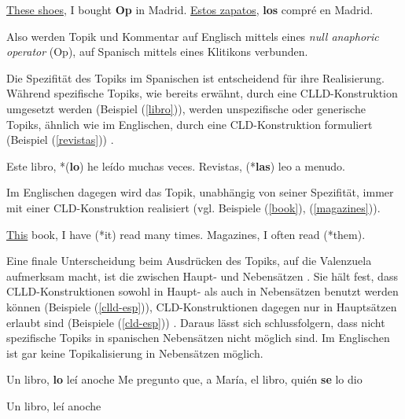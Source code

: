 \begin{exe}
    \ex \label{shoes} \uline{These shoes}, I bought \textbf{Op} in Madrid.
    \ex \label{zapatos} \uline{Estos zapatos}, \textbf{los} compré en Madrid.
\end{exe}

Also werden Topik und Kommentar auf Englisch mittels eines \textit{null anaphoric operator} (Op),
auf Spanisch mittels eines Klitikons verbunden.

Die Spezifität des Topiks im Spanischen ist entscheidend für ihre Realisierung.
Während spezifische Topiks, wie bereits erwähnt, durch eine CLLD-Konstruktion umgesetzt werden (Beispiel (\ref{libro})),
werden unspezifische oder generische Topiks, ähnlich wie im Englischen, durch eine CLD-Konstruktion formuliert (Beispiel (\ref{revistas})) \cite[vgl.][S.2]{Valenzuela05}.

\begin{exe}
    \ex \label{libro} Este libro, *(\textbf{lo}) he leído muchas veces.
    \ex \label{revistas} Revistas, (*\textbf{las}) leo a menudo.
\end{exe}

Im Englischen dagegen wird das Topik, unabhängig von seiner Spezifität, immer mit einer CLD-Konstruktion realisiert (vgl. Beispiele (\ref{book}), (\ref{magazines})).

\begin{exe}
    \ex \label{book} \uline{This} book, I have (*it) read many times.
    \ex \label{magazines} Magazines, I often read (*them).
\end{exe}

Eine finale Unterscheidung beim Ausdrücken des Topiks, auf die Valenzuela aufmerksam macht, ist die zwischen Haupt- und Nebensätzen \cite[S.2-3]{Valenzuela05}.
Sie hält fest, dass CLLD-Konstruktionen sowohl in Haupt- als auch in Nebensätzen benutzt werden können (Beispiele (\ref{clld-esp})),
CLD-Konstruktionen dagegen nur in Hauptsätzen erlaubt sind (Beispiele (\ref{cld-esp})) \cite[S.3]{Valenzuela05}.
Daraus lässt sich schlussfolgern, dass nicht spezifische Topiks in spanischen Nebensätzen nicht möglich sind.
Im Englischen ist gar keine Topikalisierung in Nebensätzen möglich.

\begin{exe}
    \ex \label{clld-esp} \begin{xlist}
        \ex Un libro, \textbf{lo} leí anoche
        \ex Me pregunto que, a María, el libro, quién \textbf{se} lo dio
        \end{xlist}
    \ex \label{cld-esp} \begin{xlist}
        \ex Un libro, leí anoche
        \end{xlist}
\end{exe}

